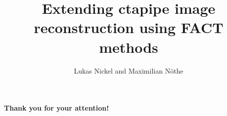 \documentclass[aspectratio=1610, 9pt]{beamer}
\title{Extending ctapipe image reconstruction using FACT methods}
\author[L Nickel/M.~Nöthe]{Lukas Nickel and Maximilian Nöthe}
\institute[{\texttt{[image: logos/e5b.pdf]}}]{E5b}
\begin{document}
\maketitle








\begin{frame}
    \centering
    {\Huge \textbf{Thank you for your attention!}}
\end{frame}

\appendix
\printbibliography
\end{document}
